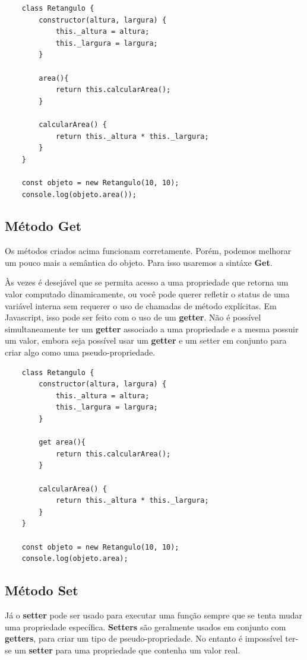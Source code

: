 \begin{lstlisting}
	class Retangulo {
		constructor(altura, largura) {
			this._altura = altura;
			this._largura = largura;
		}
	
		area(){
			return this.calcularArea();
		}
		
		calcularArea() {
			return this._altura * this._largura;
		}
	}

	const objeto = new Retangulo(10, 10);
	console.log(objeto.area());
\end{lstlisting}

\subsection{Método Get}

Os métodos criados acima funcionam corretamente. Porém, podemos melhorar um pouco mais a semântica do objeto. Para isso usaremos a sintáxe \textbf{Get}.

Às vezes é desejável que se permita acesso a uma propriedade que retorna um valor computado dinamicamente, ou você pode querer refletir o status de uma variável interna sem requerer o uso de chamadas de método explícitas. Em Javascript, isso pode ser feito com o uso de um \textbf{getter}. Não é possível simultaneamente ter um \textbf{getter} associado a uma propriedade e a mesma possuir um valor, embora seja possível usar um \textbf{getter} e um setter em conjunto para criar algo como uma pseudo-propriedade.

\begin{lstlisting}
	class Retangulo {
		constructor(altura, largura) {
			this._altura = altura;
			this._largura = largura;
		}
		
		get area(){
			return this.calcularArea();
		}
		
		calcularArea() {
			return this._altura * this._largura;
		}
	}
	
	const objeto = new Retangulo(10, 10);
	console.log(objeto.area);
\end{lstlisting}

\subsection{Método Set}

Já o \textbf{setter} pode ser usado para executar uma função sempre que se tenta mudar uma propriedade específica. \textbf{Setters} são geralmente usados em conjunto com \textbf{getters}, para criar um tipo de pseudo-propriedade. No entanto é impossível ter-se um \textbf{setter} para uma propriedade que contenha um valor real.

